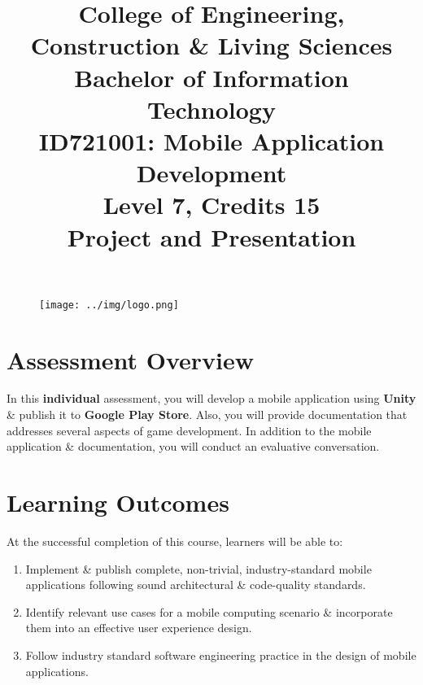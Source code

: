 \documentclass{article}
\author{}
\begin{document}
\begin{figure}
	\centering
	\texttt{[image: ../img/logo.png]}
\end{figure}

\title{College of Engineering, Construction \& Living Sciences\\Bachelor of Information Technology\\ID721001: Mobile Application Development\\Level 7, Credits 15\\\textbf{Project and Presentation}}
\date{}
\maketitle

\section*{Assessment Overview}
In this \textbf{individual} assessment, you will develop a mobile application using \textbf{Unity} \& publish it to \textbf{Google Play Store}. Also, you will provide documentation that addresses several aspects of game development. In addition to the mobile application \& documentation, you will conduct an evaluative conversation. 

\section*{Learning Outcomes}
At the successful completion of this course, learners will be able to:
\begin{enumerate}
	\item Implement \& publish complete, non-trivial, industry-standard mobile applications following sound architectural \& code-quality standards.
	\item Identify relevant use cases for a mobile computing scenario \& incorporate them into an effective user experience design.
	\item Follow industry standard software engineering practice in the design of mobile applications.
\end{enumerate}
\end{document}
